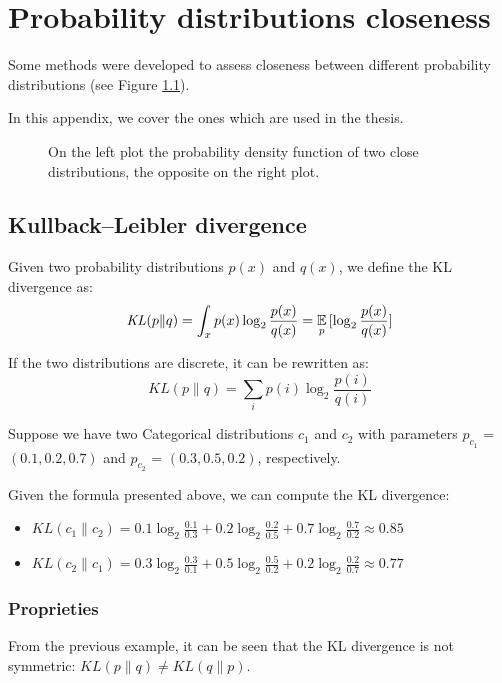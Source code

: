 \chapter{Probability distributions closeness}
Some methods were developed to assess closeness between different probability distributions (see Figure \ref{fig:diffkl}).

In this appendix, we cover the ones which are used in the thesis.

\begin{figure}[h]
    \centering
    \hfill
    \caption{On the left plot the probability density function of two close distributions, the opposite on the right plot.}
    \label{fig:diffkl}
\end{figure}

\section{Kullback–Leibler divergence}
Given two probability distributions $p(x)$ and $q(x)$, we define the KL divergence as:
\[ \mathit{KL}(p \| q) = \int_x p(x) \log_2 \frac{p(x)}{q(x)} = \operatorname*{\mathbb{E}}_p{[\log_2 \frac{p(x)}{q(x)}]}\]

If the two distributions are discrete, it can be rewritten as:
\[ \mathit{KL}(p \| q) = \sum_i p(i) \log_2 \frac{p(i)}{q(i)}\]

Suppose we have two Categorical distributions $c_1$ and $c_2$ with parameters $p_{c_1}$ = $(0.1, 0.2, 0.7)$ and $p_{c_2}$ = $(0.3, 0.5, 0.2)$, respectively.

Given the formula presented above, we can compute the KL divergence:
\begin{itemize}
    \item $\mathit{KL}(c_1 \| c_2) = 0.1 \log_2 \frac{0.1}{0.3} + 0.2 \log_2 \frac{0.2}{0.5} + 0.7 \log_2 \frac{0.7}{0.2} \approx 0.85$
    \item $\mathit{KL}(c_2 \| c_1) = 0.3 \log_2 \frac{0.3}{0.1} + 0.5 \log_2 \frac{0.5}{0.2} + 0.2 \log_2 \frac{0.2}{0.7} \approx 0.77$
\end{itemize}


\subsection{Proprieties}
From the previous example, it can be seen that the KL divergence is not symmetric: $\mathit{KL}(p \| q) \neq \mathit{KL}(q \| p)$.

